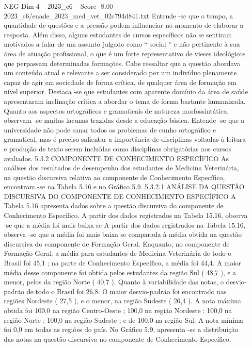 \begin{textsample}{NEG Dim 4 – 2023\_c6 – Score -8.00 – 2023\_c6/enade\_2023\_med\_vet\_02c794d841.txt}
Entende -se que o tempo, a quantidade de questões e a pressão podem influenciar no momento de elaborar a resposta.
Além disso, alguns estudantes de cursos específicos não se sentiram motivados a falar de um assunto julgado como “ social ” e não pertinente à sua área de atuação profissional, o que é um forte representativo de vieses ideológicos que perpassam determinadas formações.
Cabe ressaltar que a questão abordava um conteúdo atual e relevante a ser considerado por um indivíduo plenamente capaz de agir em sociedade de forma crítica, de qualquer área de formação em nível superior.
Destaca -se que estudantes com aparente domínio da área de saúde apresentaram inclinação crítica a abordar o tema de forma bastante humanizada.
Quanto aos aspectos ortográficos e gramaticais de natureza morfossintática, observam -se muitas lacunas trazidas desde a educação básica.
Entende -se que a universidade não pode sanar todos os problemas de cunho ortográfico e gramatical, mas é preciso salientar a importância de disciplinas voltadas à leitura e produção de texto serem incluídas como disciplinas obrigatórias nos cursos avaliados. 5.3.2 COMPONENTE DE CONHECIMENTO ESPECÍFICO As análises dos resultados de desempenho dos estudantes de Medicina Veterinária, na questão discursiva relativa ao componente de Conhecimento Específico, encontram -se na Tabela 5.16 e no Gráfico 5.9. 5.3.2.1 ANÁLISE DA QUESTÃO DISCURSIVA DO COMPONENTE DE CONHECIMENTO ESPECÍFICO A Tabela 5.16 apresenta dados sobre a questão discursiva do componente de Conhecimento Específico.
A partir dos dados registrados na Tabela 15.16, observa -se que a média foi mais baixa se A partir dos dados registrados na Tabela 15.16, observa -se que a média foi mais baixa se comparada à média obtida na questão discursiva do componente de Formação Geral.
Enquanto, no componente de Formação Geral, a média para estudantes de Medicina Veterinária de todo o Brasil foi 45,1 ; na parte de Conhecimento Específico, a média foi 44,4.
A maior média desse componente foi obtida pelos estudantes da região Sul ( 48,7 ), e a menor, pelos da região Norte ( 40,7 ).
Quanto à variabilidade das notas, o desvio-padrão de todo o Brasil foi 26,8.
O maior desvio-padrão foi encontrado nas regiões Nordeste ( 27,5 ), e o menor, na região Sudeste ( 26,4 ).
A nota máxima obtida foi 100,0 na região Centro-Oeste ; 100,0 na região Nordeste ; 100,0 na região Norte ; 100,0 na região Sudeste ; e de 100,0 na região Sul.
A nota mínima foi 0,0 em todas as regiões do país.
No Gráfico 5.9, apresenta -se a distribuição das notas na questão discursiva no componente de Conhecimento Específico.

\end{textsample}
